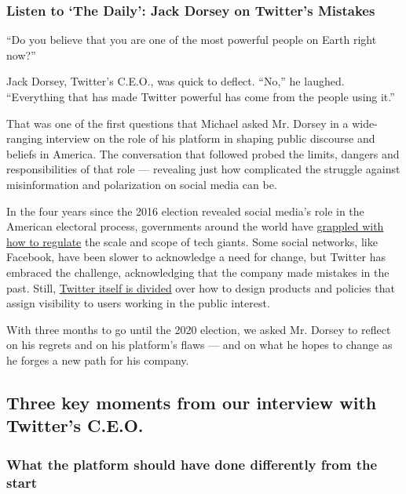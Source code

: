 \hypertarget{listen-to-the-daily-jack-dorsey-on-twitters-mistakes}{%
\subsubsection{Listen to `The Daily': Jack Dorsey on Twitter's
Mistakes}\label{listen-to-the-daily-jack-dorsey-on-twitters-mistakes}}

``Do you believe that you are one of the most powerful people on Earth
right now?''

Jack Dorsey, Twitter's C.E.O., was quick to deflect. ``No,'' he laughed.
``Everything that has made Twitter powerful has come from the people
using it.''

That was one of the first questions that Michael asked Mr. Dorsey in a
wide-ranging interview on the role of his platform in shaping public
discourse and beliefs in America. The conversation that followed probed
the limits, dangers and responsibilities of that role --- revealing just
how complicated the struggle against misinformation and polarization on
social media can be.

In the four years since the 2016 election revealed social media's role
in the American electoral process, governments around the world have
\href{https://www.nytimes3xbfgragh.onion/2020/08/04/technology/europe-big-tech.html}{grappled
with how to regulate} the scale and scope of tech giants. Some social
networks, like Facebook, have been slower to acknowledge a need for
change, but Twitter has embraced the challenge, acknowledging that the
company made mistakes in the past. Still,
\href{https://www.nytimes3xbfgragh.onion/2020/05/30/technology/twitter-trump-dorsey.html}{Twitter
itself is divided} over how to design products and policies that assign
visibility to users working in the public interest.

With three months to go until the 2020 election, we asked Mr. Dorsey to
reflect on his regrets and on his platform's flaws --- and on what he
hopes to change as he forges a new path for his company.

\hypertarget{three-key-moments-from-our-interview-with-twitters-ceo}{%
\subsection{Three key moments from our interview with Twitter's
C.E.O.}\label{three-key-moments-from-our-interview-with-twitters-ceo}}

\hypertarget{what-the-platform-should-have-done-differently-from-the-start}{%
\subsubsection{What the platform should have done differently from the
start}\label{what-the-platform-should-have-done-differently-from-the-start}}

